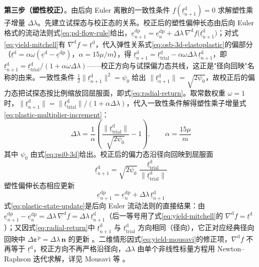 \textbf{第三步（塑性校正）}。由后向 Euler 离散的一致性条件 $f(\underline{t}^{\mathrm{d}}_{n+1})=0$ 求解塑性乘子增量 $\Delta\lambda$。先建立试探态与校正态的关系。校正后的塑性偏伸长态由后向 Euler 格式的流动法则式\eqref{eq:pd-flow-rule}给出，$\underline{e}^{\mathrm{dp}}_{n+1}=\underline{e}^{\mathrm{dp}}_{n}+\Delta\lambda\,\nabla^{\mathrm{d}}f\bigl(\underline{t}^{\mathrm{d}}_{n+1}\bigr)$；对式\eqref{eq:yield-mitchell}有 $\nabla^{\mathrm{d}}f=\underline{t}^{\mathrm{d}}$，代入弹性关系式\eqref{eq:osb-3d-elastoplastic}的偏部分（$\underline{t}^{\mathrm{d}}=\alpha\omega(\underline{e}^{\mathrm{d}}-\underline{e}^{\mathrm{dp}})$，$\alpha=15\mu/m$），得 $\underline{t}^{\mathrm{d}}_{n+1}=\underline{t}^{\mathrm{d}}_{\mathrm{trial}}-\alpha\omega\Delta\lambda\,\underline{t}^{\mathrm{d}}_{n+1}$，即 $\underline{t}^{\mathrm{d}}_{n+1}=\underline{t}^{\mathrm{d}}_{\mathrm{trial}}/(1+\alpha\omega\Delta\lambda)$——校正方向与试探偏力态共线，这正是"径向回映"名称的由来。一致性条件 $\tfrac{1}{2}\|\underline{t}^{\mathrm{d}}_{n+1}\|^{2}=\psi_{0}$ 给出 $\|\underline{t}^{\mathrm{d}}_{n+1}\|=\sqrt{2\psi_{0}}$，故校正后的偏力态把试探态按比例缩放回屈服面，即式\eqref{eq:radial-return}。取常数权重 $\omega=1$ 时，$\|\underline{t}^{\mathrm{d}}_{n+1}\|=\|\underline{t}^{\mathrm{d}}_{\mathrm{trial}}\|/(1+\alpha\Delta\lambda)$，代入一致性条件解得塑性乘子增量式\eqref{eq:plastic-multiplier-increment}：
\begin{equation}
  \Delta\lambda=\frac{1}{\alpha}\left(\frac{\bigl\|\underline{t}^{\mathrm{d}}_{\mathrm{trial}}\bigr\|}{\sqrt{2\psi_{0}}}-1\right),\qquad
  \alpha=\frac{15\mu}{m}
  \label{eq:plastic-multiplier-increment}
\end{equation}
其中 $\psi_{0}$ 由式\eqref{eq:psi0-3d}给出。校正后的偏力态沿径向回映到屈服面
\begin{equation}
  \underline{t}^{\mathrm{d}}_{n+1}=\sqrt{2\psi_{0}}\;
  \frac{\underline{t}^{\mathrm{d}}_{\mathrm{trial}}}{\bigl\|\underline{t}^{\mathrm{d}}_{\mathrm{trial}}\bigr\|}
  \label{eq:radial-return}
\end{equation}
塑性偏伸长态相应更新
\begin{equation}
  \underline{e}^{\mathrm{dp}}_{n+1}=\underline{e}^{\mathrm{dp}}_{n}+\Delta\lambda\,\underline{t}^{\mathrm{d}}_{n+1}
  \label{eq:plastic-state-update}
\end{equation}
式\eqref{eq:plastic-state-update}是后向 Euler 流动法则的直接结果：由 $\underline{e}^{\mathrm{dp}}_{n+1}-\underline{e}^{\mathrm{dp}}_{n}=\Delta\lambda\,\nabla^{\mathrm{d}}f=\Delta\lambda\,\underline{t}^{\mathrm{d}}_{n+1}$（后一等号用了式\eqref{eq:yield-mitchell}的 $\nabla^{\mathrm{d}}f=\underline{t}^{\mathrm{d}}$）；又因式\eqref{eq:radial-return}中 $\underline{t}^{\mathrm{d}}_{n+1}$ 与 $\underline{t}^{\mathrm{d}}_{\mathrm{trial}}$ 方向相同（径向），它正对应经典径向回映中 $\Delta\boldsymbol{\varepsilon}^{\mathrm{p}}=\Delta\lambda\,\mathbf{n}$ 的更新 \cite{Mitchell2011}。二维情形因式\eqref{eq:yield-mousavi}的修正项，$\nabla^{\mathrm{d}}f$ 不再等于 $\underline{t}^{\mathrm{d}}$，校正方向不再严格沿径向，$\Delta\lambda$ 由单个非线性标量方程用 Newton–Raphson 迭代求解，详见 Mousavi 等 \cite{Mousavi2021}。

